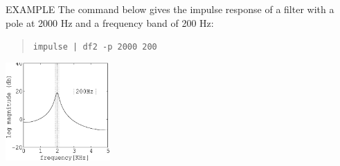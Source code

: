 \begin{options}
\end{options} 

\begin{qsection}{EXAMPLE}
The command below gives the impulse response of a filter with
a pole at 2000 Hz and a frequency band of 200 Hz:
\begin{quote}
 \verb!impulse | df2 -p 2000 200 !
\end{quote}
\hspace{3cm}
\includegraphics[width=4cm]{fig/df2.eps}
\end{qsection}
